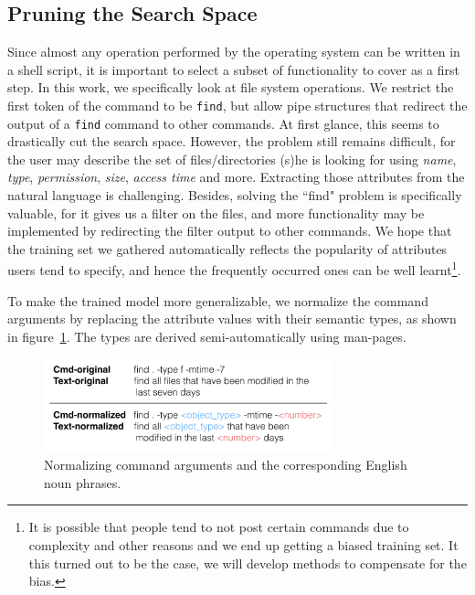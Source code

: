\subsection{Pruning the Search Space}

Since almost any operation performed by the operating system can be written in a shell script, it is important to select a subset of functionality to cover as a first step. 
In this work, we specifically look at file system operations. We restrict the first token of the command to be {\tt find}, but allow pipe structures that redirect the output of a {\tt find} command to other commands. At first glance, this seems to drastically cut the search space. However, the problem still remains difficult, for the user may describe the set of files/directories (s)he is looking for using \emph{name}, \emph{type}, \emph{permission}, \emph{size}, \emph{access time} and more. Extracting those attributes from the natural language is challenging. Besides, solving the ``find" problem is specifically valuable, for it gives us a filter on the files, and more functionality may be implemented by redirecting the filter output to other commands.
We hope that the training set we gathered automatically reflects the popularity of attributes users tend to specify, and hence the frequently occurred ones can be well learnt\footnote{It is possible that people tend to not post certain commands due to complexity and other reasons and we end up getting a biased training set. It this turned out to be the case, we will develop methods to compensate for the bias.}.

To make the trained model more generalizable, we normalize the command arguments by replacing the attribute values with their semantic types, 
as shown in figure~\ref{fig:norm}. The types are derived semi-automatically using man-pages.

\begin{figure}[t]
    \centering
    \includegraphics[width=3.3in]{normalization}
    \caption{Normalizing command arguments and the corresponding English noun phrases.}
    \label{fig:norm}
\end{figure}

